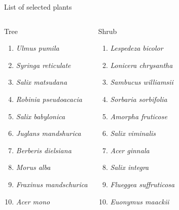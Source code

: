 \begin{frame}{List of selected plants}
\scriptsize
\begin{columns}[T,onlytextwidth]
	\begin{block}{Tree}
	\begin{enumerate}
		\item \emph{Ulmus pumila} \item \emph{Syringa reticulate} \item \emph{Salix matsudana}
		\item \emph{Robinia pseudoacacia} \item \emph{Salix babylonica} \item \emph{Juglans mandshurica}
		\item \emph{Berberis dielsiana} \item \emph{Morus alba} \item \emph{Fraxinus mandschurica}
		\item \emph{Acer mono}		
	\end{enumerate}	
	\end{block}
	
	\begin{alertblock}{Shrub}
		\begin{enumerate}			
			\item \emph{Lespedeza bicolor} \item \emph{Lonicera chrysantha} \item \emph{Sambucus williamsii}
			\item \emph{Sorbaria sorbifolia} \item \emph{Amorpha fruticose} \item \emph{Salix viminalis}
			\item \emph{Acer ginnala} \item \emph{Salix integra} \item \emph{Flueggea suffruticosa}
			\item \emph{Euonymus maackii}		
		\end{enumerate}	
	\end{alertblock}
	

\end{columns}
\end{frame}
